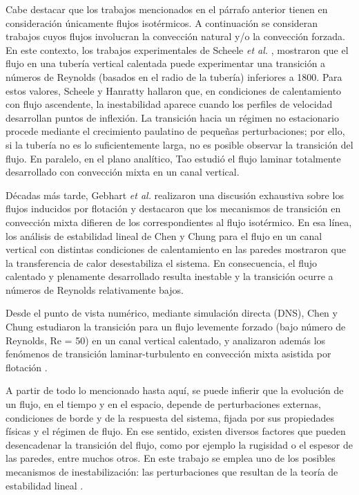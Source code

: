 Cabe destacar que los trabajos mencionados en el párrafo anterior tienen en consideración únicamente flujos isotérmicos. A continuación se consideran trabajos cuyos flujos involucran la convección natural y/o la convección forzada. En este contexto, los trabajos experimentales de Scheele \textit{et al.}  \cite{scheele1960effect}, \cite{scheele1962effect} mostraron que el flujo en una tubería vertical calentada puede experimentar una transición a números de Reynolds (basados en el radio de la tubería) inferiores a 1800. Para estos valores, Scheele y Hanratty \cite{scheele1962effect} hallaron que, en condiciones de calentamiento con flujo ascendente, la inestabilidad aparece cuando los perfiles de velocidad desarrollan puntos de inflexión. La transición hacia un régimen no estacionario procede mediante el crecimiento paulatino de pequeñas perturbaciones; por ello, si la tubería no es lo suficientemente larga, no es posible observar la transición del flujo. En paralelo, en el plano analítico, Tao \cite{tao1960} estudió el flujo laminar totalmente desarrollado con convección mixta en un canal vertical.%

Décadas más tarde, Gebhart \textit{et al.} \cite{gebhart1989buoyancy} realizaron una discusión exhaustiva sobre los flujos inducidos por flotación y destacaron que los mecanismos de transición en convección mixta difieren de los correspondientes al flujo isotérmico. En esa línea, los análisis de estabilidad lineal de Chen y Chung para el flujo en un canal vertical con distintas condiciones de calentamiento en las paredes \cite{chen1996linear,chen1998stability} mostraron que la transferencia de calor desestabiliza el sistema. En consecuencia, el flujo calentado y plenamente desarrollado resulta inestable y la transición ocurre a números de Reynolds relativamente bajos.

Desde el punto de vista numérico, mediante simulación directa (DNS), Chen y Chung \cite{chen2002direct} estudiaron la transición para un flujo levemente forzado (bajo número de Reynolds, Re = 50) en un canal vertical calentado, y analizaron además los fenómenos de transición laminar-turbulento en convección mixta asistida por flotación \cite{chen2003direct}. %

A partir de todo lo mencionado hasta aquí, se puede infierir que la evolución de un flujo, en el tiempo y en el espacio, depende de perturbaciones externas, condiciones de borde y de la respuesta del sistema, fijada por sus propiedades físicas y el régimen de flujo. En ese sentido, existen diversos factores que pueden desencadenar la transición del flujo, como por ejemplo la rugisidad o el espesor de las paredes, entre muchos otros. En este trabajo se emplea uno de los posibles mecanismos de inestabilización: las perturbaciones que resultan de la teoría de estabilidad lineal \cite{schmid}. 

